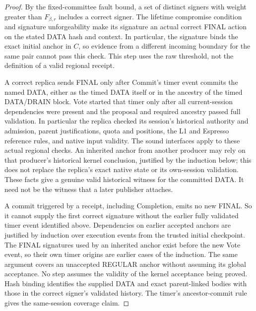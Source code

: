\documentclass[11pt,a4paper]{article}
\begin{document}
\begin{proof}
By the fixed-committee fault bound, a set of distinct signers with weight
greater than $F_{\beta,r}$ includes a correct signer. The lifetime compromise
condition and signature unforgeability make its signature an actual
correct FINAL action on the stated DATA hash and context. In particular,
the signature binds the exact initial anchor in $C$, so evidence from a
different incoming boundary for the same pair cannot pass this check.
This step uses the raw threshold, not the definition of a valid regional
receipt.

A correct replica sends FINAL only after Commit's timer event commits the
named DATA, either as the timed DATA itself or in the ancestry of the
timed DATA/DRAIN block. Vote started that timer only after all
current-session dependencies were present and the proposal and required
ancestry passed full validation. In particular the replica checked its
session's historical authority and admission, parent justifications,
quota and positions, the L1 and Espresso reference rules, and native
input validity. The sound interfaces apply to these actual regional
checks. An inherited anchor from another producer may rely on that
producer's historical kernel conclusion, justified by the induction
below; this does not replace the replica's exact native state or its
own-session validation. These facts give a genuine valid historical
witness for the committed DATA. It need not be the witness that a later
publisher attaches.

A commit triggered by a receipt, including Completion, emits no new
FINAL. So it cannot supply the first correct signature without the
earlier fully validated timer event identified above. Dependencies on
earlier accepted anchors are justified by induction over execution
events from the trusted initial checkpoint. The FINAL signatures used by
an inherited anchor exist before the new Vote event, so their own timer
origins are earlier cases of the induction. The same argument covers an
unaccepted REGULAR anchor without assuming its global acceptance. No step
assumes the validity of the kernel acceptance being proved. Hash binding
identifies the supplied DATA and exact parent-linked bodies with those in
the correct signer's validated history. The timer's ancestor-commit rule
gives the same-session coverage claim.
\end{proof}
\end{document}
